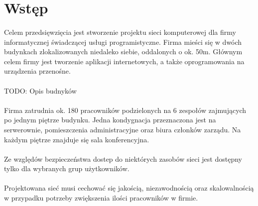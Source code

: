 \section{Wstęp}

\paragraph{}
Celem przedsięwzięcia jest stworzenie projektu sieci komputerowej dla firmy informatycznej świadczącej usługi programistyczne.
Firma mieści się w dwóch budynkach zlokalizowanych niedaleko siebie, oddalonych o ok. 50m.
Głównym celem firmy jest tworzenie aplikacji internetowych, a także oprogramowania na urządzenia przenośne.

\paragraph{}
TODO: Opis budnyków

\paragraph{}
Firma zatrudnia ok. 180 pracowników podzielonych na 6 zespołów zajmujących po jednym piętrze budynku.
Jedna kondygnacja przeznaczona jest na serwerownie, pomieszczenia administracyjne oraz biura członków zarządu.
Na każdym piętrze znajduje się sala konferencyjna.

\paragraph{}
Ze względów bezpieczeństwa dostep do niektórych zasobów sieci jest dostępny tylko dla wybranych grup użytkowników.

\paragraph{}
Projektowana sieć musi cechować się jakością, niezawodnością oraz skalowalnością w przypadku potrzeby zwiększenia ilości pracowników w firmie.

